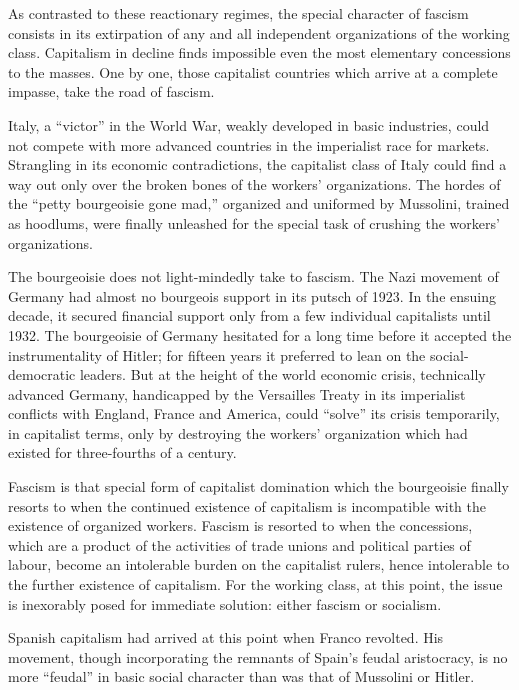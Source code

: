 As contrasted to these reactionary regimes, the special character of fascism consists in its extirpation of any and all independent organizations of the working class. Capitalism in decline finds impossible even the most elementary concessions to the masses. One by one, those capitalist countries which arrive at a complete impasse, take the road of fascism.

Italy, a ``victor'' in the World War, weakly developed in basic industries, could not compete with more advanced countries in the imperialist race for markets. Strangling in its economic contradictions, the capitalist class of Italy could find a way out only over the broken bones of the workers’ organizations. The hordes of the ``petty bourgeoisie gone mad,'' organized and uniformed by Mussolini,{\indexBMussolini} trained as hoodlums, were finally unleashed for the special task of crushing the workers’ organizations.

The bourgeoisie does not light-mindedly take to fascism. The Nazi movement of Germany had almost no bourgeois support in its putsch of 1923. In the ensuing decade, it secured financial support only from a few individual capitalists until 1932. The bourgeoisie of Germany hesitated for a long time before it accepted the instrumentality of Hitler{\indexAHitler}; for fifteen years it preferred to lean on the social-democratic leaders. But at the height of the world economic crisis, technically advanced Germany, handicapped by the Versailles Treaty in its imperialist conflicts with England, France and America, could ``solve'' its crisis temporarily, in capitalist terms, only by destroying the workers’ organization which had existed for three-fourths of a century.

Fascism is that special form of capitalist domination which the bourgeoisie finally resorts to when the continued existence of capitalism is incompatible with the existence of organized workers. Fascism is resorted to when the concessions, which are a product of the activities of trade unions and political parties of labour, become an intolerable burden on the capitalist rulers, hence intolerable to the further existence of capitalism. For the working class, at this point, the issue is inexorably posed for immediate solution: either fascism or socialism.

Spanish capitalism had arrived at this point when Franco revolted. His movement, though incorporating the remnants of Spain’s feudal aristocracy, is no more ``feudal'' in basic social character than was that of Mussolini or Hitler.

